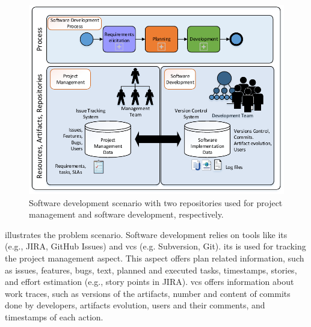 %


\begin{figure}[h]
	\centering
	\includegraphics[width=\linewidth]{figures/big-picture}
	\caption{Software development scenario with two repositories used for project management and software development, respectively.}
	\label{fig:big-picture-sd}
\end{figure}

 illustrates the problem scenario. Software development relies on tools like \gls{its} (e.g., JIRA, GitHub Issues) and \gls{vcs} (e.g. Subversion, Git). \Gls{its} is used for tracking the project management aspect. This aspect offers plan related information, such as issues, features, bugs, text, planned and executed tasks, timestamps, stories, and effort estimation (e.g., story points in JIRA).
\Gls{vcs} offers information about work traces, such as versions of the artifacts, number and content of commits done by developers, artifacts evolution, users and their comments, and timestamps of each action. 


